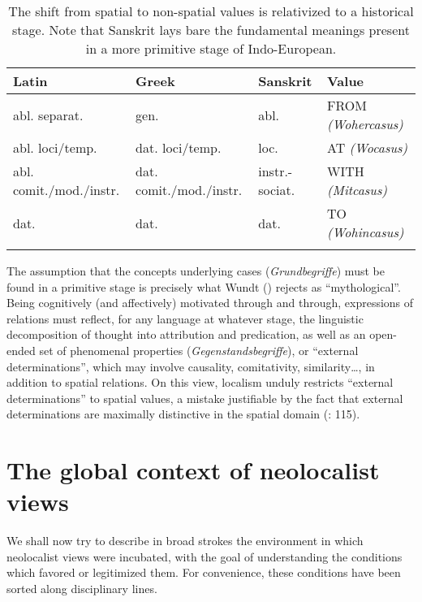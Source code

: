 \documentclass[output=paper]{langscibook}
\begin{document}
\begin{table}
\begin{tabularx}{\textwidth}{QQll}
\lsptoprule
Latin & Greek & Sanskrit  & Value\\\midrule
abl. separat. & gen. & abl. & FROM \textit{(Wohercasus)}\\ 
abl. loci\slash temp. & dat. loci\slash temp. & loc. & AT \textit{(Wocasus)}\\
abl. comit.\slash mod.\slash instr. & dat. comit.\slash mod.\slash instr. & instr.-sociat. & WITH \textit{(Mitcasus)}\\
dat. & dat. & dat.  & TO \textit{(Wohincasus)}\\
\lspbottomrule
\end{tabularx}
\caption{The shift from spatial to non-spatial values is relativized to a historical stage. Note that Sanskrit lays bare the fundamental meanings present in a more primitive stage of Indo-European.}
\end{table}

The assumption that the concepts underlying cases (\textit{Grundbegriffe}) must be found in a primitive stage is precisely what Wundt (\citealt{wundt_volkerpsychologie._1912}) rejects as “mythological”. Being cognitively (and affectively) motivated through and through, expressions of relations must reflect, for any language at whatever stage, the linguistic decomposition of thought into attribution and predication, as well as an open-ended set of phenomenal properties (\textit{Gegenstandsbegriffe}), or “external determinations”, which may involve causality, comitativity, similarity…, in addition to spatial relations. On this view, localism unduly restricts “external determinations” to spatial values, a mistake justifiable by the fact that external determinations are maximally distinctive in the spatial domain (\citealt{wundt_volkerpsychologie._1912}: 115).

\section{The global context of neolocalist views}
We shall now try to describe in broad strokes the environment in which neolocalist views were incubated, with the goal of understanding the conditions which favored or legitimized them. For convenience, these conditions have been sorted along disciplinary lines. 
\end{document}
